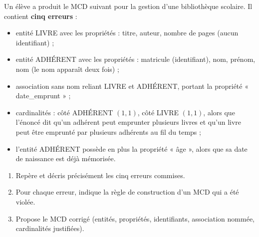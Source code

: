 \documentclass[11pt]{article}
\begin{document}
\begin{exercice}
Un élève a produit le MCD suivant pour la gestion d'une bibliothèque scolaire. Il contient \textbf{cinq erreurs} :

\begin{itemize}
\item entité LIVRE avec les propriétés : titre, auteur, nombre de pages (aucun identifiant) ;
\item entité ADHÉRENT avec les propriétés : matricule (identifiant), nom, prénom, nom (le nom apparaît deux fois) ;
\item association sans nom reliant LIVRE et ADHÉRENT, portant la propriété « date\_emprunt » ;
\item cardinalités : côté ADHÉRENT $(1, 1)$, côté LIVRE $(1, 1)$, alors que l'énoncé dit qu'un adhérent peut emprunter plusieurs livres et qu'un livre peut être emprunté par plusieurs adhérents au fil du temps ;
\item l'entité ADHÉRENT possède en plus la propriété « âge », alors que sa date de naissance est déjà mémorisée.
\end{itemize}

\begin{enumerate}
\item Repère et décris précisément les cinq erreurs commises.
\item Pour chaque erreur, indique la règle de construction d'un MCD qui a été violée.
\item Propose le MCD corrigé (entités, propriétés, identifiants, association nommée, cardinalités justifiées).
\end{enumerate}
\end{exercice}
\end{document}
